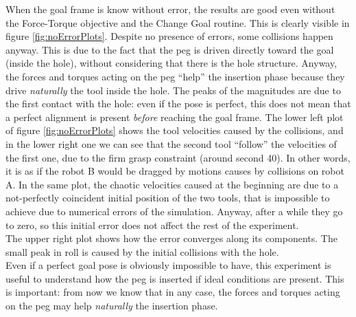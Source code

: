 When the goal frame is know without error, the results are good even without the Force-Torque objective and the Change Goal routine. This is clearly visible in figure \ref{fig:noErrorPlots}. Despite no presence of errors, some collisions happen anyway. This is due to the fact that the peg is driven  directly toward the goal (inside the hole), without considering that there is the hole structure. Anyway, the forces and torques acting on the peg \enquote{help} the insertion phase because they drive \textit{naturally} the tool inside the hole. The peaks of the magnitudes are due to the first contact with the hole: even if the pose is perfect, this does not mean that a perfect alignment is present \textit{before} reaching the goal frame.
The lower left plot of figure \ref{fig:noErrorPlots} shows the tool velocities caused by the collisions, and in the lower right one we can see that the second tool \enquote{follow} the velocities of the first one, due to the firm grasp constraint (around second 40). In other words, it is as if the robot B would be dragged by motions causes by collisions on robot A. In the same plot, the chaotic velocities caused at the beginning are due to a not-perfectly coincident initial position of the two tools, that is impossible to achieve due to numerical errors of the simulation. Anyway, after a while they go to zero, so this initial error does not affect the rest of the experiment.\\ 
The upper right plot shows how the error converges along its components. The small peak in roll is caused by the initial collisions with the hole.\\
Even if a perfect goal pose is obviously impossible to have, this experiment is useful to understand how the peg is inserted if ideal conditions are present. This is important: from now we know that in any case, the forces and torques acting on the peg may help \textit{naturally} the insertion phase.\\

